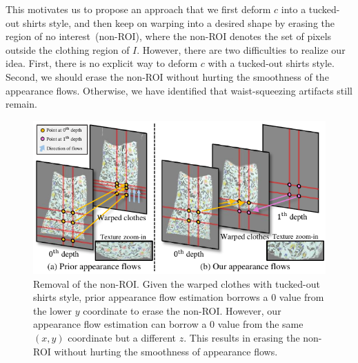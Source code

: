 \documentclass[letterpaper]{article} %
\begin{document}
This motivates us to propose an approach that we first deform $c$ into a tucked-out shirts style, and then keep on warping into a desired shape by erasing the region of no interest~(non-ROI), where the non-ROI denotes the set of pixels outside the clothing region of $I$.
However, there are two difficulties to realize our idea. First, there is no explicit way to deform $c$ with a tucked-out shirts style. Second, we should erase the non-ROI without hurting the smoothness of the appearance flows. Otherwise, we have identified that waist-squeezing artifacts still remain. 

\begin{figure}[t]
    \centering
     \includegraphics[width=\linewidth]{fig/fig3.pdf}
     \caption{Removal of the non-ROI. Given the warped clothes with tucked-out shirts style, prior appearance flow estimation borrows a 0 value from the lower $y$ coordinate to erase the non-ROI. However, our appearance flow estimation can borrow a 0 value from the same $(x,y)$ coordinate but a different $z$. This results in erasing the non-ROI without hurting the smoothness of appearance flows.} 
     \label{fig_4_temp}
\end{figure}
\end{document}
